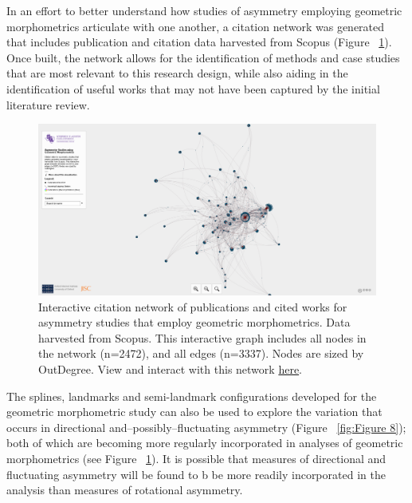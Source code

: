 \documentclass[preprint,12pt]{elsarticle}
\begin{document}
In an effort to better understand how studies of asymmetry employing geometric morphometrics articulate with one another, a citation network was generated that includes publication and citation data harvested from Scopus (Figure ~\ref{fig:FigureNetwork}). Once built, the network allows for the identification of methods and case studies that are most relevant to this research design, while also aiding in the identification of useful works that may not have been captured by the initial literature review. 

\begin{figure}[ht]\centering
\includegraphics[width=\linewidth]{FigNet1}
\caption{Interactive citation network of publications and cited works for asymmetry studies that employ geometric morphometrics. Data harvested from Scopus. This interactive graph includes all nodes in the network (n=2472), and all edges (n=3337). Nodes are sized by OutDegree. View and interact with this network \href{http://crhr-archive.sfasu.edu/AsymmetryIntFig1/}{here}.}
\label{fig:FigureNetwork}
\end{figure}

The splines, landmarks and semi-landmark configurations developed for the geometric morphometric study can also be used to explore the variation that occurs in directional and--possibly--fluctuating asymmetry \citep{Klingenberg:3} (Figure ~\ref{fig:Figure 8}); both of which are becoming more regularly incorporated in analyses of geometric morphometrics (see Figure ~\ref{fig:FigureNetwork}). It is possible that measures of directional and fluctuating asymmetry will be found to b be more readily incorporated in the analysis than measures of rotational asymmetry.
\end{document}
